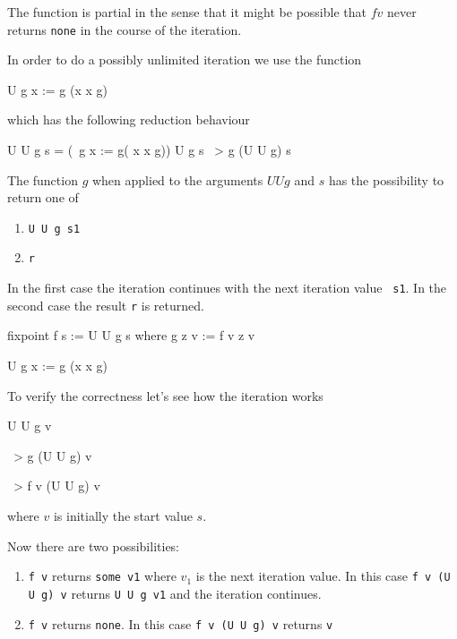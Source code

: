 \documentclass[12pt]{article}
\begin{document}
The function is partial in the sense that it might be possible that $f v$ never
returns {\tt none} in the course of the iteration.

In order to do a possibly unlimited iteration we use the function
\begin{lam}
    U g x := g (x x g)
\end{lam}
which has the following reduction behaviour
\begin{lam}
    U U g s    =    (\ g x := g( x x g)) U g s
              ~>    g (U U g) s
\end{lam}
The function $g$ when applied to the arguments $U U g$ and $s$ has the
possibility to return one of
\begin{enumerate}
    \item {\tt U U g s1}

    \item {\tt r}
\end{enumerate}

In the first case the iteration continues with the next iteration value {\tt
s1}. In the second case the result {\tt r} is returned.

\begin{lam}
    fixpoint f s :=
        U U g s where
            g z v :=
                f v z v

            U g x :=
                g (x x g)
\end{lam}

To verify the correctness let's see how the iteration works
\begin{lam}
    U U g v

    ~> g (U U g) v

    ~> f v (U U g) v
\end{lam}
where $v$ is initially the start value $s$.

Now there are two possibilities:
\begin{enumerate}
    \item {\tt f v} returns {\tt some v1} where $v_1$ is the next iteration value.
        In this case {\tt f v (U U g) v} returns {\tt U U g v1} and the
        iteration continues.

    \item {\tt f v} returns {\tt none}. In this case {\tt f v (U U g) v} returns
        {\tt v}
\end{enumerate}
\end{document}
